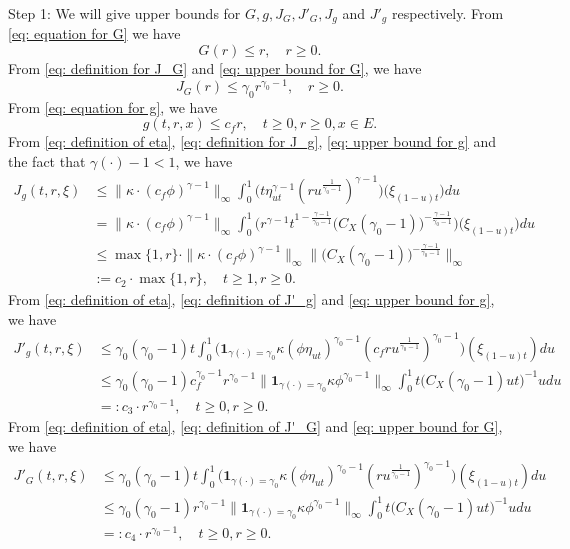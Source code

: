 \documentclass[12pt, a4paper]{amsart}
\theoremstyle{definition}
\numberwithin{equation}{section}
\begin{document}
	Step 1:
	We will give upper bounds for $G,g, J_G, J'_G, J_g$ and $J'_g$ respectively.
	From \eqref{eq: equation for G} we have
\[\label{eq: upper bound for G}
	G(r)
	\leq r,
	\quad r \geq 0.
\]	
	From \eqref{eq: definition for J_G} and \eqref{eq: upper bound for G}, we have
\[\label{eq: upper bound for J_G}
	J_G(r)
	\leq \gamma_0 r^{\gamma_0 - 1},
	\quad r \geq 0.
\]
	From \eqref{eq: equation for g}, we have
\[\label{eq: upper bound for g}
	g(t,r, x) \leq c_f r,
	\quad t\geq 0, r \geq 0, x\in E.
\]
	From \eqref{eq: definition of eta}, \eqref{eq: definition for J_g}, \eqref{eq: upper bound for g} and the fact that $\gamma(\cdot) - 1 < 1$, we have
\[\begin{split}
	J_g(t,r, \xi)
	&\leq \|\kappa \cdot (c_f\phi)^{\gamma - 1} \|_\infty \int_0^1 \big(  t\eta_{ut}^{\gamma - 1} (ru^{\frac{1}{\gamma_0 - 1}} )^{\gamma-1}  \big) \big(  \xi_{(1-u)t} \big) du
	\\&= \| \kappa \cdot (c_f\phi)^{\gamma - 1} \|_\infty \int_0^1 \big(  r^{\gamma - 1}t^{1-\frac{\gamma - 1}{\gamma_0 - 1}}  \big( C_X (\gamma_0 - 1) \big)^{-\frac{\gamma - 1}{\gamma_0 - 1}}  \big) \big( \xi_{(1-u)t} \big) du
	\\& \leq \max\{1,r\} \cdot \| \kappa \cdot (c_f\phi)^{\gamma - 1} \|_\infty \Big\|  \big( C_X (\gamma_0 - 1) \big)^{-\frac{\gamma - 1}{\gamma_0 - 1}}\Big\|_\infty
	\\& := c_2 \cdot \max  \{1,r\},
	\quad t\geq 1, r\geq 0.
\end{split}\]
	From \eqref{eq: definition of eta}, \eqref{eq: definition of J'_g} and \eqref{eq: upper bound for g}, we have
\[\begin{split}
	J'_g(t,r,\xi)
	&\leq \gamma_0 (\gamma_0 - 1) t \int_0^1 \big( \mathbf 1_{\gamma(\cdot) = \gamma_0} \kappa (\phi \eta_{ut})^{\gamma_0 - 1} (c_f ru^{\frac{1}{\gamma_0 - 1}})^{\gamma_0 - 1}\big) (\xi_{(1-u)t}) du
	\\&\leq \gamma_0(\gamma_0 - 1) c_f^{\gamma_0 - 1}r^{\gamma_0 - 1} \|  \mathbf 1_{\gamma(\cdot) = \gamma_0}  \kappa \phi^{\gamma_0 - 1} \|_\infty \int_0^1 t \big( C_X(\gamma_0 - 1) ut \big)^{- 1}  u  du
	\\&=: c_3 \cdot r^{\gamma_0 - 1},
	\quad t\geq 0, r\geq 0.
\end{split}\]
	From \eqref{eq: definition of eta}, \eqref{eq: definition of J'_G} and \eqref{eq: upper bound for G}, we have
\[\label{eq: upper bound for J'_G} \begin{split}
	J'_G(t,r,\xi)
	&\leq \gamma_0 (\gamma_0 - 1) t \int_0^1 \big( \mathbf 1_{\gamma(\cdot) = \gamma_0} \kappa (\phi \eta_{ut})^{\gamma_0 - 1} (ru^{\frac{1}{\gamma_0 - 1}})^{\gamma_0 - 1}\big) (\xi_{(1-u)t}) du
	\\&\leq \gamma_0(\gamma_0 - 1) r^{\gamma_0 - 1} \big\|   \mathbf 1_{\gamma(\cdot) = \gamma_0}  \kappa \phi^{\gamma_0 - 1} \big\|_\infty \int_0^1 t \big(  C_X(\gamma_0 - 1) ut \big)^{- 1}  u  du
	\\&=: c_4 \cdot r^{\gamma_0 - 1},
	\quad t\geq 0, r\geq 0.
\end{split}\]
\end{document}
